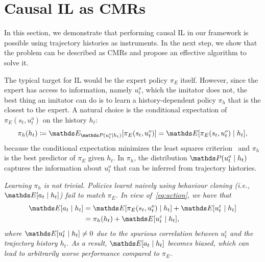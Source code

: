 \section{Causal IL as CMRs}\label{sec:method}

In this section, we demonstrate that performing causal IL in our framework is possible using trajectory histories as instruments. In the next step, we show that the problem can be described as CMRs and propose an effective algorithm to solve it.

The typical target for IL would be the expert policy $\pi_E$ itself. However, since the expert has access to information, namely $u^o_t$, which the imitator does not, the best thing an imitator can do is to learn a history-dependent policy $\pi_h$ that is the closest to the expert. A natural choice is the conditional expectation of $\pi_E(s_t,u^o_t)$ on the history $h_t$:
\begin{align}
\pi_h(h_t)\coloneqq \expectE_{\probP(u^o_t\mid h_t)}[\pi_E(s_t,u^o_t)]=\expectE[\pi_E(s_t,u^o_t)\mid h_t],\nonumber
\end{align}
because the conditional expectation minimizes the least squares criterion~\citep{hastie01statisticallearning} and $\pi_h$ is the best predictor of $\pi_E$ given $h_t$. In $\pi_h$, the distribution $\probP(u^o_t\mid h_t)$ captures the information about $u^o_t$ that can be inferred from trajectory histories.
\begin{remark}
\emph{Learning $\pi_h$ is not trivial. Policies learnt naively using behaviour cloning (i.e., $\expectE[a_t\mid h_t]$) fail to match $\pi_E$. In view of~\cref{eq:action}, we have that
\begin{align} 
\expectE[a_t\mid h_t]&=\expectE[\pi_E(s_t,u^o_t) \mid h_{t}]+\expectE[u^\epsilon_t\mid h_{t}]\nonumber\\
&=\pi_h(h_t)+\expectE[u^\epsilon_t\mid h_{t}],\label{eq:history_policy}
\end{align}
where $\expectE[u^\epsilon_t\mid h_{t}]\neq 0$ due to the spurious correlation between $u^\epsilon_t$ and the trajectory history $h_t$. As a result, $\expectE[a_t\mid h_t]$ becomes biased, which can lead to arbitrarily worse performance compared to $\pi_E$.   }
\end{remark}

\vspace{-5pt}
